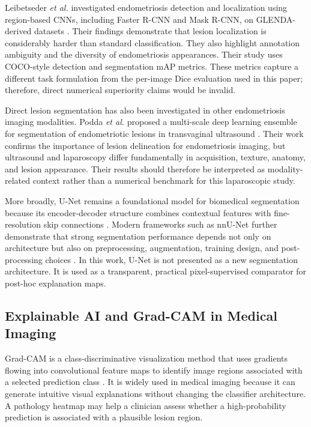 Leibetseder \emph{et al.} investigated endometriosis detection and localization using region-based CNNs, including Faster R-CNN and Mask R-CNN, on GLENDA-derived datasets \cite{leibetseder2022localization}. Their findings demonstrate that lesion localization is considerably harder than standard classification. They also highlight annotation ambiguity and the diversity of endometriosis appearances. Their study uses COCO-style detection and segmentation mAP metrics. These metrics capture a different task formulation from the per-image Dice evaluation used in this paper; therefore, direct numerical superiority claims would be invalid.

Direct lesion segmentation has also been investigated in other endometriosis imaging modalities. Podda \emph{et al.} proposed a multi-scale deep learning ensemble for segmentation of endometriotic lesions in transvaginal ultrasound \cite{podda2024multiscale}. Their work confirms the importance of lesion delineation for endometriosis imaging, but ultrasound and laparoscopy differ fundamentally in acquisition, texture, anatomy, and lesion appearance. Their results should therefore be interpreted as modality-related context rather than a numerical benchmark for this laparoscopic study.

More broadly, U-Net remains a foundational model for biomedical segmentation because its encoder-decoder structure combines contextual features with fine-resolution skip connections \cite{ronneberger2015unet}. Modern frameworks such as nnU-Net further demonstrate that strong segmentation performance depends not only on architecture but also on preprocessing, augmentation, training design, and post-processing choices \cite{isensee2021nnunet}. In this work, U-Net is not presented as a new segmentation architecture. It is used as a transparent, practical pixel-supervised comparator for post-hoc explanation maps.

\subsection{Explainable AI and Grad-CAM in Medical Imaging}

Grad-CAM is a class-discriminative visualization method that uses gradients flowing into convolutional feature maps to identify image regions associated with a selected prediction class \cite{selvaraju2017gradcam}. It is widely used in medical imaging because it can generate intuitive visual explanations without changing the classifier architecture. A pathology heatmap may help a clinician assess whether a high-probability prediction is associated with a plausible lesion region.

